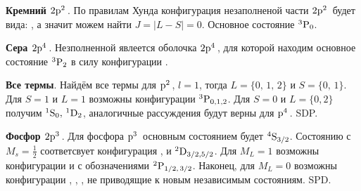 
\textbf{Кремний $2\textnormal{p}^{2}\,$}. По правилам Хунда конфигурация незаполненой части $2\textnormal{p}^{2}\,$ будет вида: , а значит можем найти $J = |L-S| = 0$. Основное состояние ${}^{3}\textnormal{P}_{0}$.

\textbf{Сера  $2\textnormal{p}^{4}\,$}. Незполненной явлеется оболочка $2\textnormal{p}^{4}\,$, для которой находим основное состояние ${}^{3}\textnormal{P}_{2}$ в силу конфигурации .

\textbf{Все термы}. 
 Найдём все термы для $\textnormal{p}^{2}\,$, $l=1$, тогда $L = \{0,\, 1,\, 2\}$ и $S = \{0,\, 1\}$. 
Для $S=1$ и $L=1$ возможны конфигурации ${}^{3}\textnormal{P}_{0, 1, 2}$. Для $S = 0$ и $L=\{0,2\}$ получим ${}^{1}\textnormal{S}_{0},\, {}^{1}\textnormal{D}_{2}$, аналогичные рассуждения будут верны для $\textnormal{p}^{4}\,$. SDP.

\textbf{Фосфор  $2\textnormal{p}^{3}\,$}. 
Для фосфора $\textnormal{p}^{3}\,$ основным состоянием будет ${}^{4}\textnormal{S}_{3/2}$. Состоянию с $M_s = \frac{1}{2}$ соответсвует конфигурация , и ${}^{2}\textnormal{D}_{3/2, 5/2}$. Для $M_L = 1$ возможны конфигурации  и  с обозначениями ${}^{2}\textnormal{P}_{1/2,\, 3/2}$. Наконец, для $M_L = 0$ возможны конфигурации , , , не приводящие к новым независимым состояниям. SPD.

